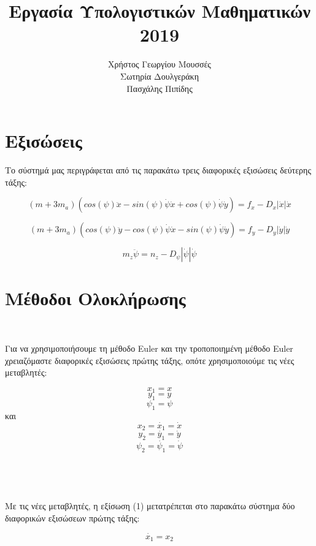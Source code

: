 \documentclass{article}
\begin{document}
 
\title{Εργασία Υπολογιστικών Μαθηματικών 2019}
\author{Χρήστος Γεωργίου Μουσσές\\Σωτηρία Δουλγεράκη\\Πασχάλης Πιπίδης}
\date{}

\maketitle
\newpage
\tableofcontents
\newpage

\section{Εξισώσεις}

Το σύστημά μας περιγράφεται από τις παρακάτω τρεις διαφορικές εξισώσεις δεύτερης τάξης: 

\begin{equation}
(m + 3m_a)(cos(\psi)\ddot{x} - sin(\psi)\dot{\psi}\dot{x} + cos(\psi)\dot{\psi}\dot{y}) = f_x - D_x|\dot{x}|\dot{x}
\end{equation}

\begin{equation}
(m + 3m_a)(cos(\psi)\ddot{y} - cos(\psi)\dot{\psi}\dot{x} - sin(\psi)\dot{\psi}\dot{y}) = f_y - D_y|\dot{y}|\dot{y}
\end{equation}

\begin{equation}
m_z\ddot{\psi} = n_z - D_\psi|\dot{\psi}|\dot{\psi}
\end{equation}

\section{Μέθοδοι Ολοκλήρωσης}\

Για να χρησιμοποιήσουμε τη μέθοδο Euler και την τροποποιημένη μέθοδο Euler χρειαζόμαστε διαφορικές εξισώσεις πρώτης τάξης, οπότε χρησιμοποιούμε τις νέες μεταβλητές:

\[
x_1 = x
\]
\[
y_1 = y
\]
\[
\psi_1 = \psi
\]
και
\[
x_2 = \dot{x_1} = \dot{x} 
\]
\[
y_2 = \dot{y_1} = \dot{y} 
\]
\[
\psi_2 = \dot{\psi_1} = \dot{\psi} 
\]
\\\\\\\\
Με τις νέες μεταβλητές, η εξίσωση (1) μετατρέπεται στο παρακάτω σύστημα δύο διαφορικών εξισώσεων πρώτης τάξης:

\begin{equation}
\dot{x_1} = x_2
\end{equation}
\end{document}
